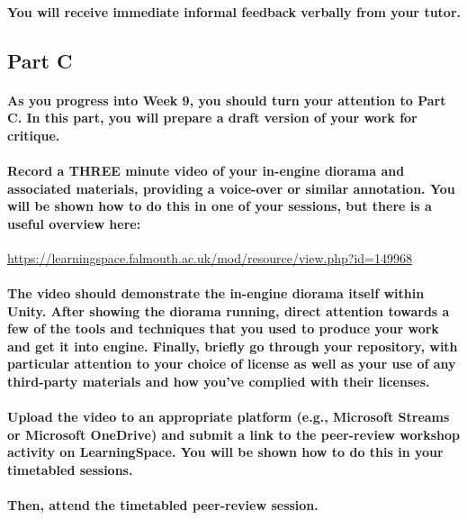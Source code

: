 \documentclass{../../fal_assignment}
\begin{document}
\paragraph{You will receive immediate \textbf{informal feedback} verbally from your \textbf{tutor}.}

\subsection*{Part C}

\paragraph{As you progress into Week 9, you should turn your attention to Part C. In this part, you will prepare a draft version of your work for critique.}

\paragraph{Record a \textbf{THREE} minute video of your in-engine diorama and associated materials, providing a voice-over or similar annotation. You will be shown how to do this in one of your sessions, but there is a useful overview here:}

\url{https://learningspace.falmouth.ac.uk/mod/resource/view.php?id=149968}

\paragraph{The video should demonstrate the in-engine diorama itself within Unity. After showing the diorama running, direct attention towards a few of the tools and techniques that you used to produce your work and get it into engine. Finally, briefly go through your repository, with particular attention to your choice of license as well as your use of any third-party materials and how you've complied with their licenses.}

\paragraph{Upload the video to an appropriate platform (e.g., Microsoft Streams or Microsoft OneDrive) and submit a link to the peer-review workshop activity on LearningSpace. You will be shown how to do this in your timetabled sessions.}

\paragraph{Then, attend the timetabled peer-review session.}
\end{document}
